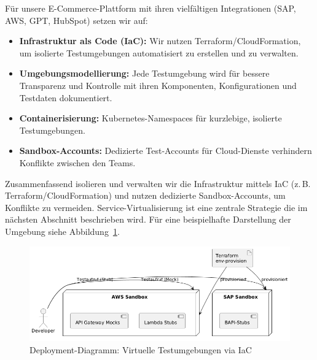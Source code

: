Für unsere E-Commerce-Plattform mit ihren vielfältigen Integrationen (SAP, AWS, GPT, HubSpot) setzen wir auf:

\begin{itemize}
    \item \textbf{Infrastruktur als Code (IaC):} Wir nutzen Terraform/CloudFormation, um isolierte
    Testumgebungen automatisiert zu erstellen und zu verwalten.
    \item \textbf{Umgebungsmodellierung:} Jede Testumgebung wird für bessere Transparenz und
    Kontrolle mit ihren Komponenten, Konfigurationen und Testdaten dokumentiert.
    \item \textbf{Containerisierung:} Kubernetes-Namespaces für kurzlebige, isolierte Testumgebungen.
    \item \textbf{Sandbox-Accounts:} Dedizierte Test-Accounts für Cloud-Dienste verhindern
    Konflikte zwischen den Teams.
\end{itemize}

Zusammenfassend isolieren und verwalten wir die Infrastruktur mittels IaC
(z.\,B. Terraform/CloudFormation) und nutzen dedizierte Sandbox-Accounts, um Konflikte zu vermeiden.
Service-Virtualisierung ist eine zentrale Strategie die im nächsten Abschnitt beschrieben wird.
Für eine beispielhafte Darstellung der Umgebung siehe Abbildung~\ref{fig:deployment}.

\newpage

\begin{figure}[h!]
    \centering
    \includegraphics[width=1\textwidth]{fig/stubing.png}
    \caption{Deployment-Diagramm: Virtuelle Testumgebungen via IaC}
    \label{fig:deployment}
\end{figure}

